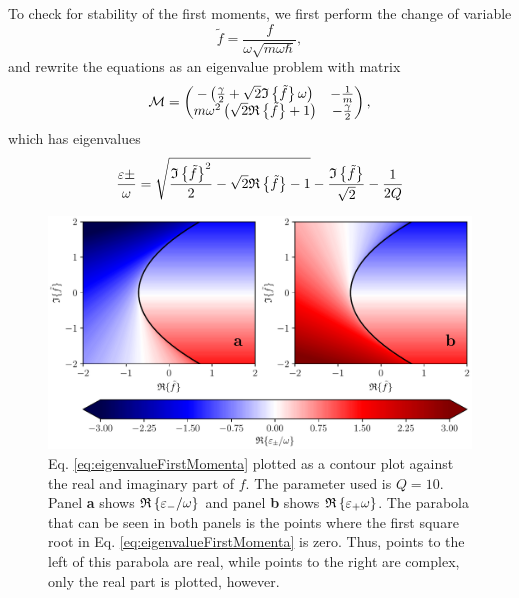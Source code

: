 To check for stability of the first moments, we first perform the change of variable
\begin{equation}
    \tilde{f} = \frac{f}{\omega \sqrt{m \omega \hbar}},
\end{equation}
and rewrite the equations as an eigenvalue problem with matrix
\begin{equation}
    \mathcal{M} = 
    \begin{pmatrix}
        - \left(\frac{\gamma}{2} + \sqrt{2} \mathfrak{I}\left\{\tilde{f}\right\} \omega \right) & - \frac{1}{m} \\
        m \omega^2\left(\sqrt{2}\mathfrak{R}\left\{\tilde{f}\right\} + 1\right) & -\frac{\gamma}{2}
    \end{pmatrix}, \label{eq:matrixM}
\end{equation}
which has eigenvalues
\begin{equation}
    \frac{\varepsilon\pm}{\omega} = \sqrt{\frac{\mathfrak{I}\left\{\tilde{f}\right\}^2}{2} - \sqrt{2} \mathfrak{R}\left\{\tilde{f}\right\} - 1 } - \frac{\mathfrak{I}\left\{\tilde{f}\right\}}{ \sqrt{2}} - \frac{1}{2Q} \label{eq:eigenvalueFirstMomenta}
\end{equation}


\begin{figure}
    \centering
    \includegraphics[width=\textwidth]{figures/eigenvalueFirstMomenta.pdf}
    \caption{\small Eq. \eqref{eq:eigenvalueFirstMomenta} plotted as a contour plot against the real and imaginary part of $f$. The parameter used is $Q = 10$. Panel \textbf{a} shows $\mathfrak{R}\left\{\varepsilon_-/\omega\right\}$ and panel \textbf{b} shows $\mathfrak{R}\left\{\varepsilon_+\omega\right\}$. The parabola that can be seen in both panels is the points where the first square root in Eq. \eqref{eq:eigenvalueFirstMomenta} is zero. Thus, points to the left of this parabola are real, while points to the right are complex, only the real part is plotted, however.}
    \label{fig:eigenvalueFirstMomenta}
\end{figure}

